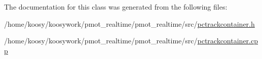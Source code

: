 \-The documentation for this class was generated from the following files\-:\begin{DoxyCompactItemize}
\item 
/home/koosy/koosywork/pmot\-\_\-realtime/pmot\-\_\-realtime/src/\hyperlink{pctrackcontainer_8h}{pctrackcontainer.\-h}\item 
/home/koosy/koosywork/pmot\-\_\-realtime/pmot\-\_\-realtime/src/\hyperlink{pctrackcontainer_8cpp}{pctrackcontainer.\-cpp}\end{DoxyCompactItemize}
